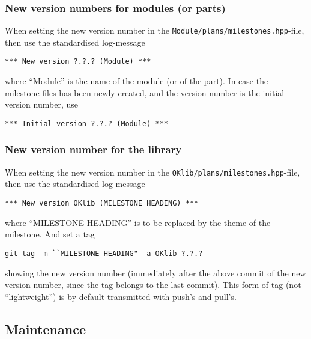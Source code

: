 \documentclass{book}
\newcommand{\filename}[1]{\texttt{#1}}
\begin{document}
\subsubsection{New version numbers for modules (or parts)}
\label{sec:GitSpecialeventsTransitionsmodules}

When setting the new version number in the \filename{Module/plans/milestones.hpp}-file, then use the standardised log-message
\begin{verbatim}
*** New version ?.?.? (Module) ***
\end{verbatim}
where ``Module'' is the name of the module (or of the part). In case the milestone-files has been newly created, and the version number is the initial version number, use
\begin{verbatim}
*** Initial version ?.?.? (Module) ***
\end{verbatim}




\subsubsection{New version number for the library}
\label{sec:GitSpecialeventsNewversionlibrary}

When setting the new version number in the \filename{OKlib/plans/milestones.hpp}-file, then use the standardised log-message
\begin{verbatim}
*** New version OKlib (MILESTONE HEADING) ***
\end{verbatim}
where ``MILESTONE HEADING'' is to be replaced by the theme of the milestone. And set a tag
\begin{verbatim}
git tag -m ``MILESTONE HEADING" -a OKlib-?.?.?
\end{verbatim}
showing the new version number (immediately after the above commit of the new version number, since the tag belongs to the last commit). This form of tag (not ``lightweight'') is by default transmitted with push's and pull's.







\subsection{Maintenance}
\label{sec:GitMaintenance}
\end{document}
